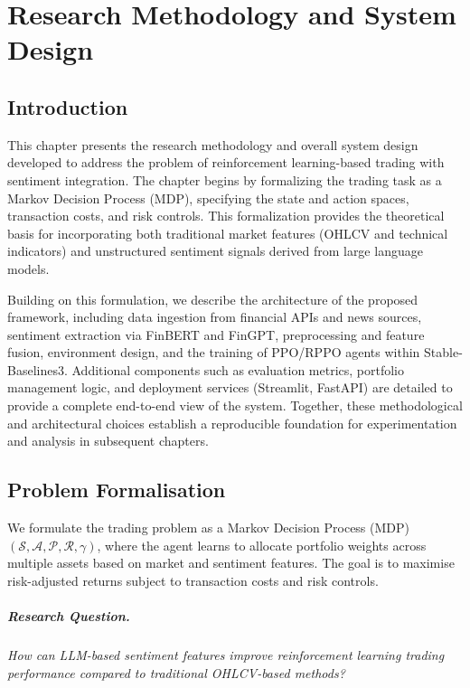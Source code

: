 \documentclass[12pt,a4paper]{report}
\begin{document}

\chapter{Research Methodology and System Design}

\section{Introduction}

This chapter presents the research methodology and overall system design developed to address the problem of reinforcement learning-based trading with sentiment integration. The chapter begins by formalizing the trading task as a Markov Decision Process (MDP), specifying the state and action spaces, transaction costs, and risk controls. This formalization provides the theoretical basis for incorporating both traditional market features (OHLCV and technical indicators) and unstructured sentiment signals derived from large language models.  

Building on this formulation, we describe the architecture of the proposed framework, including data ingestion from financial APIs and news sources, sentiment extraction via FinBERT and FinGPT, preprocessing and feature fusion, environment design, and the training of PPO/RPPO agents within Stable-Baselines3. Additional components such as evaluation metrics, portfolio management logic, and deployment services (Streamlit, FastAPI) are detailed to provide a complete end-to-end view of the system. Together, these methodological and architectural choices establish a reproducible foundation for experimentation and analysis in subsequent chapters.

\section{Problem Formalisation}

We formulate the trading problem as a Markov Decision Process (MDP) 
\((\mathcal{S}, \mathcal{A}, \mathcal{P}, \mathcal{R}, \gamma)\), where 
the agent learns to allocate portfolio weights across multiple assets 
based on market and sentiment features. The goal is to maximise 
risk-adjusted returns subject to transaction costs and risk controls.

\paragraph{Research Question.}
\emph{How can LLM-based sentiment features improve reinforcement learning 
trading performance compared to traditional OHLCV-based methods?}
\end{document}
